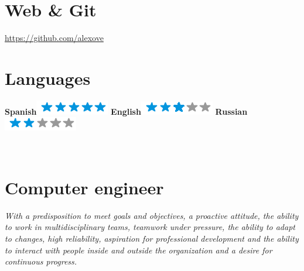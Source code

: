 \documentclass[]{friggeri-cv}
\begin{document}
\begin{aside}
    \section{Web \& Git}
    \href{https://github.com/alexove}{https://github.com/alexove}
    ~
    \section{Languages}
    \textbf{Spanish}\includegraphics[scale=0.40]{img/5stars.png}
    \textbf{English}\includegraphics[scale=0.40]{img/3stars.png}
    \textbf{Russian}\includegraphics[scale=0.40]{img/2stars.png}
    ~
\end{aside}
~
\section{Computer engineer}
\emph{With a predisposition to meet goals and objectives, a proactive attitude, 
the ability to work in multidisciplinary teams, teamwork under pressure, the 
ability to adapt to changes, high reliability, aspiration for professional 
development and the ability to interact with people inside and outside the 
organization and a desire for continuous progress.}
\\
\end{document}

